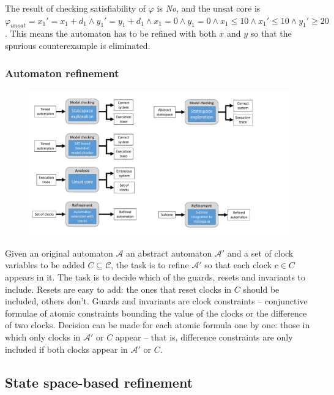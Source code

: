 \begin{runningExample}
	The result of checking satisfiability of $\varphi$ is \emph{No}, and the unsat core is $\varphi_{unsat}=x_1'=x_1+d_1 \wedge y_1'=y_1+d_1 \wedge x_1=0 \wedge y_1=0 \wedge x_1 \leq 10 \wedge x_1' \leq 10 \wedge y_1' \geq 20$. This means the automaton has to be refined with both $x$ and $y$ so that the spurious counterexample is eliminated.
\end{runningExample}

\subsubsection{Automaton refinement}

\begin{figure}[h]
	\centering
	\includegraphics[width=.7\textwidth]{include/figures/modules_ta_ref}
\end{figure}

Given an original automaton $\mathcal{A}$ an abstract automaton $\mathcal{A'}$ and a set of clock variables to be added $C \subseteq \mathcal{C}$, the task is to refine $\mathcal{A'}$ so that each clock $c \in C$ appears in it. The task is to decide which of the guards, resets and invariants to include. Resets are easy to add: the ones that reset clocks in $C$ should be included, others don't. Guards and invariants are clock constraints -- conjunctive formulae of atomic constraints bounding the value of the clocks or the difference of two clocks. Decision can be made for each atomic formula one by one: those in which only clocks in $\mathcal{A'}$ or $C$ appear -- that is, difference constraints are only included if both clocks appear in $\mathcal{A'}$ or $C$.




\subsection{State space-based refinement}

